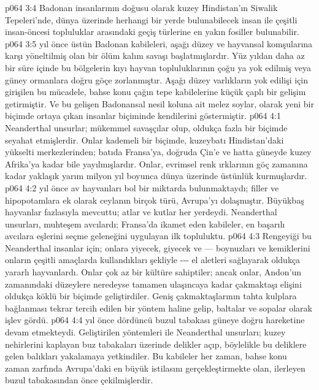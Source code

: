 \vs p064 3:4 Badonan insanlarının doğusu olarak kuzey Hindistan’ın Siwalik Tepeleri’nde, dünya üzerinde herhangi bir yerde bulunabilecek insan ile çeşitli insan\hyp{}öncesi topluluklar arasındaki geçiş türlerine en yakın fosiller bulunabilir.
\vs p064 3:5  yıl önce üstün Badonan kabileleri, aşağı düzey ve hayvansal komşularına karşı yöneltilmiş olan bir ölüm kalım savaşı başlatmışlardır. Yüz yıldan daha az bir süre içinde bu bölgelerin kıyı hayvan topluluklarının çoğu ya yok edilmiş veya güney ormanlara doğru göçe zorlanmıştır. Aşağı düzey varlıkların yok edilişi için girişilen bu mücadele, bahse konu çağın tepe kabilelerine küçük çaplı bir gelişim getirmiştir. Ve bu gelişen Badonansal nesil koluna ait melez soylar,  olarak yeni bir biçimde ortaya çıkan insanlar biçiminde kendilerini göstermiştir.
\vs p064 4:1 Neanderthal unsurlar; mükemmel savaşçılar olup, oldukça fazla bir biçimde seyahat etmişlerdir. Onlar kademeli bir biçimde, kuzeybatı Hindistan’daki yükselti merkezlerinden; batıda Fransa’ya, doğruda Çin’e ve hatta güneyde kuzey Afrika’ya kadar bile yayılmışlardır. Onlar, evrimsel renk ırklarının göç zamanına kadar yaklaşık yarım milyon yıl boyunca dünya üzerinde üstünlük kurmuşlardır.
\vs p064 4:2  yıl önce av hayvanları bol bir miktarda bulunmaktaydı; filler ve hipopotamlara ek olarak ceylanın birçok türü, Avrupa’yı dolaşmıştır. Büyükbaş hayvanlar fazlasıyla mevcuttu; atlar ve kutlar her yerdeydi. Neanderthal unsurları, muhteşem avcılardı; Fransa’da ikamet eden kabileler, en başarılı avcılara eşlerini seçme geleneğini uygulayan ilk topluluktu.
\vs p064 4:3 Rengeyiği bu Neanderthal insanlar için; onlara yiyecek, giyecek ve --- boynuzları ve kemiklerini onların çeşitli amaçlarda kullandıkları şekliyle \hyp{}\hyp{}\hyp{} el aletleri sağlayarak oldukça yararlı hayvanlardı. Onlar çok az bir kültüre sahiptiler; ancak onlar, Andon’un zamanındaki düzeylere neredeyse tamamen ulaşıncaya kadar çakmaktaşı elişini oldukça köklü bir biçimde geliştirdiler. Geniş çakmaktaşlarının tahta kulplara bağlanması tekrar tercih edilen bir yöntem haline gelip, baltalar ve sopalar olarak işlev gördü.
\vs p064 4:4  yıl önce dördüncü buzul tabakası güneye doğru hareketine devam etmekteydi. Geliştirilen yöntemleri ile Neanderthal unsurları; kuzey nehirlerini kaplayan buz tabakaları üzerinde delikler açıp, böylelikle bu deliklere gelen balıkları yakalamaya yetkindiler. Bu kabileler her zaman, bahse konu zaman zarfında Avrupa’daki en büyük istilasını gerçekleştirmekte olan, ilerleyen buzul tabakasından önce çekilmişlerdir.
